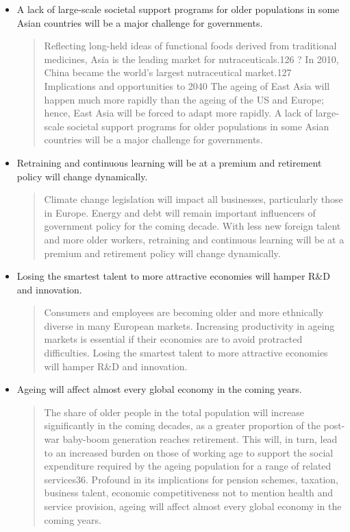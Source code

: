 \begin{itemize}
	\item A lack of large-scale societal support programs for older populations in some Asian countries will be a major challenge for governments.
	\begin{quotation}
		Reflecting long-held ideas of functional foods derived from traditional medicines, Asia is the leading market for nutraceuticals.126 ? In 2010, China became the world's largest nutraceutical market.127 Implications and opportunities to 2040 The ageing of East Asia will happen much more rapidly than the ageing of the US and Europe; hence, East Asia will be forced to adapt more rapidly. A lack of large-scale societal support programs for older populations in some Asian countries will be a major challenge for governments.
	\end{quotation}
	\item Retraining and continuous learning will be at a premium and retirement policy will change dynamically.
	\begin{quotation}
		Climate change legislation will impact all businesses, particularly those in Europe. Energy and debt will remain important influencers of government policy for the coming decade. With less new foreign talent and more older workers, retraining and continuous learning will be at a premium and retirement policy will change dynamically.
	\end{quotation}
	\item Losing the smartest talent to more attractive economies will hamper R\&D and innovation.
	\begin{quotation}
		Consumers and employees are becoming older and more ethnically diverse in many European markets. Increasing productivity in ageing markets is essential if their economies are to avoid protracted difficulties. Losing the smartest talent to more attractive economies will hamper R\&D and innovation.
	\end{quotation}
	\item Ageing will affect almost every global economy in the coming years.
	\begin{quotation}The share of older people in the total population will increase significantly in the coming decades, as a greater proportion of the post-war baby-boom generation reaches retirement. This will, in turn, lead to an increased burden on those of working age to support the social expenditure required by the ageing population for a range of related services36. Profound in its implications for pension schemes, taxation, business talent, economic competitiveness not to mention health and service provision, ageing will affect almost every global economy in the coming years.\end{quotation}

\end{itemize}
